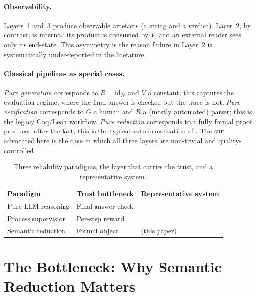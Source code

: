 \documentclass[11pt,a4paper]{article}
\newcommand{\IRpipeline}{\textsc{srf}}
\newcommand{\Coq}{Coq}
\newcommand{\Lean}{Lean}
\begin{document}
\paragraph{Observability.}  Layers~1 and~3 produce observable
artefacts (a string and a verdict).  Layer~2, by contrast, is
internal: its product is consumed by $V$, and an external reader
sees only its end-state.  This asymmetry is the reason failure in
Layer~2 is systematically under-reported in the literature.

\paragraph{Classical pipelines as special cases.}
\emph{Pure generation} corresponds to $R = \mathrm{id}_\mathcal{N}$
and $V$ a constant; this captures the \citet{lewkowycz2022minerva}
evaluation regime, where the final answer is checked but the trace
is not.  \emph{Pure verification} corresponds to $G$ a human and
$R$ a (mostly automated) parser; this is the legacy
\Coq{}/\Lean{} workflow.  \emph{Pure reduction} corresponds to a
fully formal proof produced after the fact; this is the typical
autoformalization of \citet{wu2022autoformalization}.  The
\IRpipeline{} advocated here is the case in which all three layers
are non-trivial and quality-controlled.

\begin{table}[t]
\centering
\caption{Three reliability paradigms, the layer that carries the
trust, and a representative system.}
\label{tab:paradigms}
\begin{tabular}{lll}
\toprule
Paradigm & Trust bottleneck & Representative system \\
\midrule
Pure LLM reasoning   & Final-answer check & \citet{lewkowycz2022minerva} \\
Process supervision & Per-step reward & \citet{lightman2023letsverify} \\
Semantic reduction  & Formal object & \citet{yang2023leandojo} (this paper) \\
\bottomrule
\end{tabular}
\end{table}

\section{The Bottleneck: Why Semantic Reduction Matters}
\label{sec:bottleneck}
\end{document}

